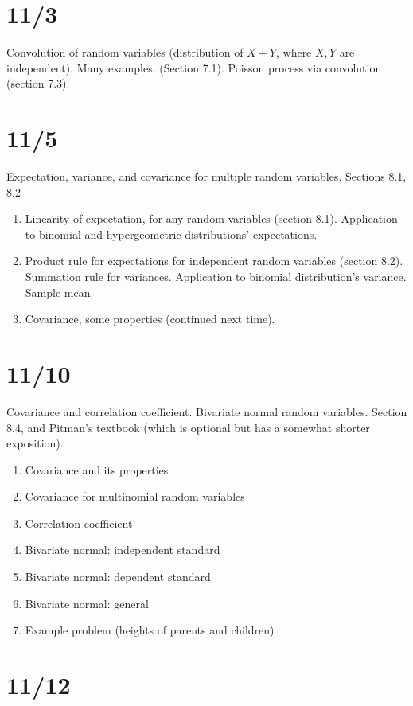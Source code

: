\documentclass[letterpaper,11pt,oneside,reqno]{amsart}
\numberwithin{equation}{section}
\theoremstyle{definition}
\begin{document}
\section{11/3}

Convolution of random variables (distribution of $X+Y$, where $X,Y$ are independent).
Many examples. (Section 7.1).
Poisson process via convolution (section 7.3).

\section{11/5}

Expectation, variance, and covariance for multiple random variables.
Sections 8.1, 8.2

\begin{enumerate}
	\item Linearity of expectation, for any random variables
		(section 8.1). Application to binomial and hypergeometric 
		distributions'
		expectations.
	\item Product rule for expectations for independent random
		variables (section 8.2). 
		Summation rule for variances. 
		Application to binomial distribution's variance.
		Sample mean.
	\item Covariance, some properties (continued next time).
\end{enumerate}


\section{11/10}

Covariance and correlation coefficient. Bivariate normal random variables.
Section 8.4, and Pitman's textbook (which is optional but has a somewhat shorter exposition).
\begin{enumerate}
	\item Covariance and its properties
	\item Covariance for multinomial random variables
	\item Correlation coefficient
	\item Bivariate normal: independent standard
	\item Bivariate normal: dependent standard
	\item Bivariate normal: general
	\item Example problem (heights of parents and children)
\end{enumerate}

\section{11/12}
\end{document}
